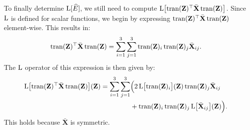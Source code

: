 
To finally determine $\operatorname{L}[\widehat{E}]$, we still need to compute $\operatorname{L}\bigl[\operatorname{tran}(\mathbf{Z})^\top\bar{\mathbf{X}}\operatorname{tran}(\mathbf{Z})\bigr]$. Since $\operatorname{L}$ is defined for scalar functions, we begin by expressing $\operatorname{tran}(\mathbf{Z})^\top\bar{\mathbf{X}}\operatorname{tran}(\mathbf{Z})$ element-wise. This results in:
\begin{align}
    \operatorname{tran}(\mathbf{Z})^\top\bar{\mathbf{X}}\operatorname{tran}(\mathbf{Z}) = \sum_{i=1}^{3}\sum_{j=1}^{3} \operatorname{tran}(\mathbf{Z})_{i}\operatorname{tran}(\mathbf{Z})_{j}\bar{\mathbf{X}}_{ij}.
\end{align}
The $\operatorname{L}$ operator of this expression is then given by:
\begin{align}
    \begin{split}
        \operatorname{L}\bigl[\operatorname{tran}(\mathbf{Z})^\top\bar{\mathbf{X}}\operatorname{tran}(\mathbf{Z})\bigr](\mathbf{Z}) = \sum_{i=1}^{3}\sum_{j=1}^{3}& \Bigl(2\operatorname{L}\bigl[\operatorname{tran}(\mathbf{Z})_{i}\bigr](\mathbf{Z})\operatorname{tran}(\mathbf{Z})_{j}\bar{\mathbf{X}}_{ij} \\
        & +\operatorname{tran}(\mathbf{Z})_{i}\operatorname{tran}(\mathbf{Z})_{j}\operatorname{L}\bigl[\bar{\mathbf{X}}_{ij}\bigr](\mathbf{Z})\Bigr). \label{eq:appendix-L-zXz-final-sum}
    \end{split}
\end{align}
This holds because $\bar{\mathbf{X}}$ is symmetric. 

